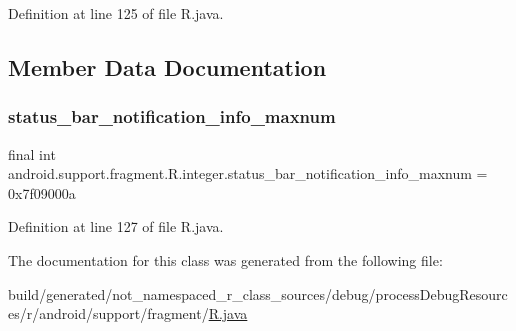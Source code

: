 Definition at line 125 of file R.\+java.


\begin{DoxyCode}{0}

\end{DoxyCode}


\subsection{Member Data Documentation}
\mbox{\label{classandroid_1_1support_1_1fragment_1_1_r_1_1integer_ad45b5b452400c150732cf1ffbf992c84}} 
\subsubsection{\texorpdfstring{status\_bar\_notification\_info\_maxnum}{status\_bar\_notification\_info\_maxnum}}
{\footnotesize\ttfamily final int android.\+support.\+fragment.\+R.\+integer.\+status\+\_\+bar\+\_\+notification\+\_\+info\+\_\+maxnum = 0x7f09000a\hspace{0.3cm}{\ttfamily [static]}}



Definition at line 127 of file R.\+java.



The documentation for this class was generated from the following file\+:\begin{DoxyCompactItemize}
\item 
build/generated/not\+\_\+namespaced\+\_\+r\+\_\+class\+\_\+sources/debug/process\+Debug\+Resources/r/android/support/fragment/\mbox{\hyperlink{android_2support_2fragment_2_r_8java}{R.\+java}}\end{DoxyCompactItemize}
